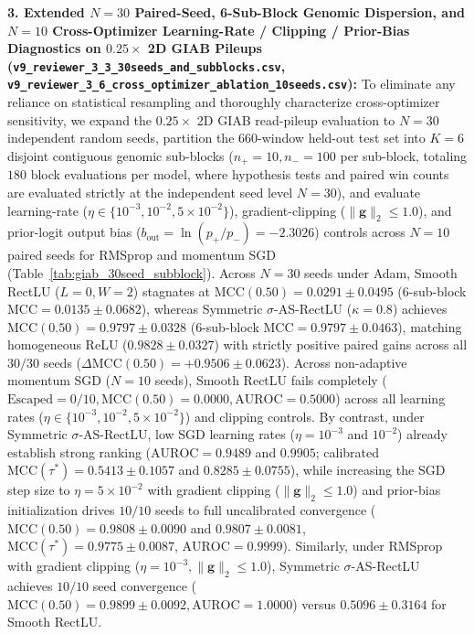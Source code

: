 \documentclass[11pt, a4paper]{article}
\begin{document}
\noindent\textbf{3. Extended $N = 30$ Paired-Seed, 6-Sub-Block Genomic Dispersion, and $N = 10$ Cross-Optimizer Learning-Rate / Clipping / Prior-Bias Diagnostics on $0.25\times$ 2D GIAB Pileups (\texttt{v9\_reviewer\_3\_3\_30seeds\_and\_subblocks.csv}, \texttt{v9\_reviewer\_3\_6\_cross\_optimizer\_ablation\_10seeds.csv}):} To eliminate any reliance on statistical resampling and thoroughly characterize cross-optimizer sensitivity, we expand the $0.25\times$ 2D GIAB read-pileup evaluation to $N = 30$ independent random seeds, partition the 660-window held-out test set into $K = 6$ disjoint contiguous genomic sub-blocks ($n_+ = 10, n_- = 100$ per sub-block, totaling $180$ block evaluations per model, where hypothesis tests and paired win counts are evaluated strictly at the independent seed level $N=30$), and evaluate learning-rate ($\eta \in \{10^{-3}, 10^{-2}, 5\times 10^{-2}\}$), gradient-clipping ($\|\mathbf{g}\|_2 \le 1.0$), and prior-logit output bias ($b_{\mathrm{out}} = \ln(p_+/p_-) = -2.3026$) controls across $N = 10$ paired seeds for RMSprop and momentum SGD (Table~\ref{tab:giab_30seed_subblock}). Across $N = 30$ seeds under Adam, Smooth RectLU ($L=0, W=2$) stagnates at $\mathrm{MCC}(0.50) = 0.0291 \pm 0.0495$ (6-sub-block $\mathrm{MCC} = 0.0135 \pm 0.0682$), whereas Symmetric $\sigma$-AS-RectLU ($\kappa = 0.8$) achieves $\mathrm{MCC}(0.50) = 0.9797 \pm 0.0328$ (6-sub-block $\mathrm{MCC} = 0.9797 \pm 0.0463$), matching homogeneous ReLU ($0.9828 \pm 0.0327$) with strictly positive paired gains across all $30/30$ seeds ($\Delta\mathrm{MCC}(0.50) = +0.9506 \pm 0.0623$). Across non-adaptive momentum SGD ($N=10$ seeds), Smooth RectLU fails completely ($\mathrm{Escaped} = 0/10, \mathrm{MCC}(0.50) = 0.0000, \mathrm{AUROC} = 0.5000$) across all learning rates ($\eta \in \{10^{-3}, 10^{-2}, 5\times 10^{-2}\}$) and clipping controls. By contrast, under Symmetric $\sigma$-AS-RectLU, low SGD learning rates ($\eta = 10^{-3}$ and $10^{-2}$) already establish strong ranking ($\mathrm{AUROC} = 0.9489$ and $0.9905$; calibrated $\mathrm{MCC}(\tau^*) = 0.5413 \pm 0.1057$ and $0.8285 \pm 0.0755$), while increasing the SGD step size to $\eta = 5\times 10^{-2}$ with gradient clipping ($\|\mathbf{g}\|_2 \le 1.0$) and prior-bias initialization drives $10/10$ seeds to full uncalibrated convergence ($\mathrm{MCC}(0.50) = 0.9808 \pm 0.0090$ and $0.9807 \pm 0.0081$, $\mathrm{MCC}(\tau^*) = 0.9775 \pm 0.0087$, $\mathrm{AUROC} = 0.9999$). Similarly, under RMSprop with gradient clipping ($\eta = 10^{-3}, \|\mathbf{g}\|_2 \le 1.0$), Symmetric $\sigma$-AS-RectLU achieves $10/10$ seed convergence ($\mathrm{MCC}(0.50) = 0.9899 \pm 0.0092, \mathrm{AUROC} = 1.0000$) versus $0.5096 \pm 0.3164$ for Smooth RectLU.
\end{document}
